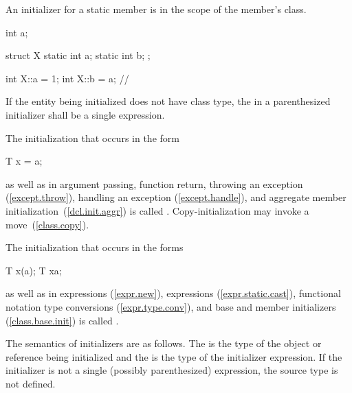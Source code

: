 \pnum
{}%
An initializer for a static member is in the scope of the member's class.
\enterexample

\begin{codeblock}
int a;

struct X {
  static int a;
  static int b;
};

int X::a = 1;
int X::b = a;       // 
\end{codeblock}
\exitexample

\pnum
If the entity being initialized does not have class type, the
 in a
parenthesized initializer shall be a single expression.

\pnum
{}%
%
The initialization that occurs in the form

\begin{codeblock}
T x = a;
\end{codeblock}

as well as in argument passing, function return,
throwing an exception (\ref{except.throw}),
handling an exception (\ref{except.handle}),
and aggregate member initialization~(\ref{dcl.init.aggr})
is called
.
\enternote Copy-initialization may invoke a move~(\ref{class.copy}). \exitnote

\pnum
The initialization that occurs in the forms

\begin{codeblock}
T x(a);
T x{a};
\end{codeblock}

as well as in
expressions (\ref{expr.new}),
expressions (\ref{expr.static.cast}),
functional notation type conversions (\ref{expr.type.conv}),
and base and member initializers (\ref{class.base.init})
is called
.

\pnum
The semantics of initializers are as follows.
The
%
is the type of the object or reference being initialized and the
is the type of the initializer expression.
If the initializer is not a single (possibly parenthesized) expression, the
source type is not defined.

